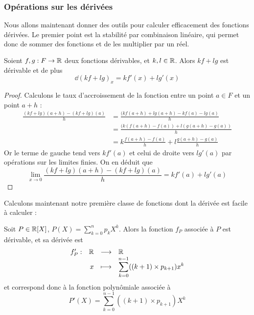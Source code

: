 \subsubsection{Opérations sur les dérivées}

Nous allons maintenant donner des outils pour calculer efficacement des fonctions dérivées. Le premier point est la stabilité par combinaison linéaire, qui permet donc de sommer des fonctions et de les multiplier par un réel.

\begin{prop}
    Soient $f,g : F\to \mathbb{R}$ deux fonctions dérivables, et $k,l\in\mathbb{R}$. Alors $kf+lg$ est dérivable et de plus $$\dd (kf+lg)_x = k f'(x) + l g'(x)$$
\end{prop}

\begin{proof}
    Calculons le taux d'accroissement de la fonction entre un point $a\in F$ et un point $a+h$ :
    \begin{align*}
        \displaystyle{\frac{(kf+lg)(a+h)-(kf+lg)(a)}{h}} &= \displaystyle{\frac{(k f(a+h)+ lg(a+h)-kf(a) - lg(a)}{h}}\\
        &= \displaystyle{\frac{(k(f(a+h)-f(a)) + l(g(a+h)-g(a))}{h}}\\
        &= \displaystyle{k\frac{f(a+h)-f(a)}{h} + l\frac{g(a+h)-g(a)}{h}}
    \end{align*}
    Or le terme de gauche tend vers $kf'(a)$ et celui de droite vers $lg'(a)$ par opérations sur les limites finies. On en déduit que $$\boxed{\lim_{x\to 0} \frac{(kf+lg)(a+h)-(kf+lg)(a)}{h} = kf'(a)+lg'(a)}$$
\end{proof}

Calculons maintenant notre première classe de fonctions dont la dérivée est facile à calculer :

\begin{prop}
    Soit $P\in\mathbb{R}[X]$, $P(X) = \sum_{k=0}^n p_k X^k$. Alors la fonction $f_P$ associée à $P$ est dérivable, et sa dérivée est $$\begin{array}[t]{lrcl} f_{P}': & \mathbb{R} & \longrightarrow & \mathbb{R} \\ & x & \longmapsto & \displaystyle\sum_{k=0}^{n-1}((k+1)\times p_{k+1})x^k \end{array}$$ et correspond donc à la fonction polynômiale associée à $$P'(X) = \sum_{k=0}^{n-1}((k+1)\times p_{k+1})X^k$$
\end{prop}

